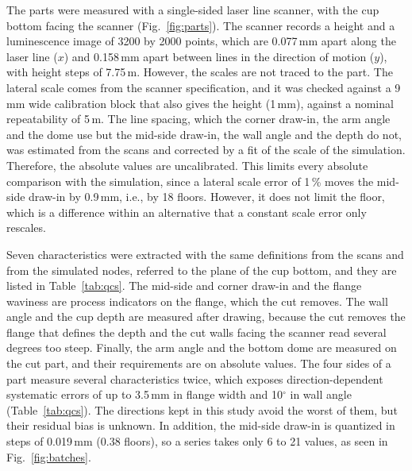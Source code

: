 \documentclass[pdflatex,sn-basic,lineno]{sn-jnl}
\begin{document}
The parts were measured with a single-sided laser line scanner, with the cup bottom facing the scanner (Fig.~\ref{fig:parts}). The scanner records a height and a luminescence image of 3200 by 2000 points, which are 0.077\,mm apart along the laser line ($x$) and 0.158\,mm apart between lines in the direction of motion ($y$), with height steps of 7.75\,\textmu m. However, the scales are not traced to the part. The lateral scale comes from the scanner specification, and it was checked against a 9\,mm wide calibration block that also gives the height (1\,mm), against a nominal repeatability of 5\,\textmu m. The line spacing, which the corner draw-in, the arm angle and the dome use but the mid-side draw-in, the wall angle and the depth do not, was estimated from the scans and corrected by a fit of the scale of the simulation. Therefore, the absolute values are uncalibrated. This limits every absolute comparison with the simulation, since a lateral scale error of 1\,\% moves the mid-side draw-in by 0.9\,mm, i.e., by 18 floors. However, it does not limit the floor, which is a difference within an alternative that a constant scale error only rescales.

Seven characteristics were extracted with the same definitions from the scans and from the simulated nodes, referred to the plane of the cup bottom, and they are listed in Table~\ref{tab:qcs}. The mid-side and corner draw-in and the flange waviness are process indicators on the flange, which the cut removes. The wall angle and the cup depth are measured after drawing, because the cut removes the flange that defines the depth and the cut walls facing the scanner read several degrees too steep. Finally, the arm angle and the bottom dome are measured on the cut part, and their requirements are on absolute values. The four sides of a part measure several characteristics twice, which exposes direction-dependent systematic errors of up to 3.5\,mm in flange width and 10$^\circ$ in wall angle (Table~\ref{tab:qcs}). The directions kept in this study avoid the worst of them, but their residual bias is unknown. In addition, the mid-side draw-in is quantized in steps of 0.019\,mm (0.38 floors), so a series takes only 6 to 21 values, as seen in Fig.~\ref{fig:batches}.
\end{document}
